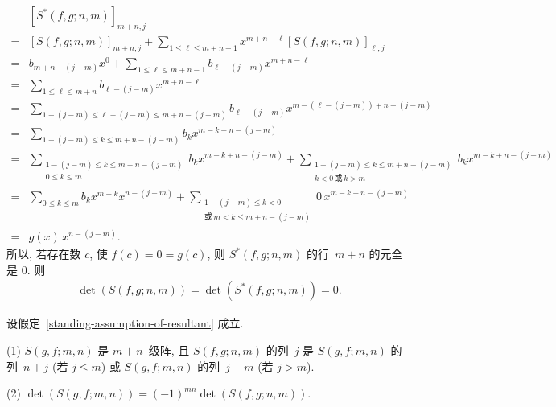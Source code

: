 \documentclass[../libro.tex]{subfiles}
\begin{document}
\begin{align*}
    &
    [S^* (f, g; n, m)]_{m+n,j}
    \\
    = {} &
    [S(f, g; n, m)]_{m+n,j}
    + \sum_{1 \leq \ell \leq m+n-1}
    {x^{m+n-\ell} [S(f, g; n, m)]_{\ell,j}}
    \\
    = {} &
    b_{m+n-(j-m)} x^0
    + \sum_{1 \leq \ell \leq m+n-1}
    {b_{\ell-(j-m)} x^{m+n-\ell}}
    \\
    = {} &
    \sum_{1 \leq \ell \leq m+n}
    {b_{\ell-(j-m)} x^{m+n-\ell}}
    \\
    = {} &
    \sum_{1-(j-m) \leq \ell-(j-m) \leq m+n-(j-m)}
    {b_{\ell-(j-m)} x^{m-(\ell-(j-m))+n-(j-m)}}
    \\
    = {} &
    \sum_{1-(j-m) \leq k \leq m+n-(j-m)}
    {b_k x^{m-k+n-(j-m)}}
    \\
    = {} &
    \sum_{\substack{
            1-(j-m) \leq k \leq m+n-(j-m) \\
            0 \leq k \leq m
    }}
    {b_k x^{m-k+n-(j-m)}}
    +
    \sum_{\substack{
            1-(j-m) \leq k \leq m+n-(j-m) \\
            k < 0 \,\text{或}\, k > m
    }}
    {b_k x^{m-k+n-(j-m)}}
    \\
    = {} &
    \sum_{0 \leq k \leq m}
    {b_k x^{m-k} x^{n-(j-m)}}
    +
    \sum_{\substack{
            1-(j-m) \leq k < 0 \\
            \text{或}\, m < k \leq m+n-(j-m)
    }}
    {0\, x^{m-k+n-(j-m)}}
    \\
    = {} &
    g(x)\, x^{n-(j-m)}.
\end{align*}
所以, 若存在数 \(c\), 使 \(f(c) = 0 = g(c)\),
则 \(S^* (f, g; n, m)\) 的行~\(m + n\) 的元全是 \(0\).
则
\begin{align*}
    \det {(S(f, g; n, m))}
    = \det {(S^* (f, g; n, m))}
    = 0.
\end{align*}

\begin{theorem}\label{thm:resultant-swap}
    设假定~\ref{standing-assumption-of-resultant} 成立.

    (1)
    \(S(g, f; m, n)\) 是 \(m + n\)~级阵,
    且 \(S(f, g; n, m)\) 的列~\(j\) 是
    \(S(g, f; m, n)\) 的列~\(n + j\)
    (若 \(j \leq m\))
    或 \(S(g, f; m, n)\) 的列~\(j - m\)
    (若 \(j > m\)).

    (2)
    \(\det {(S(g, f; m, n))}
    = (-1)^{m n} \det {(S(f, g; n, m))}\).
\end{theorem}
\end{document}
